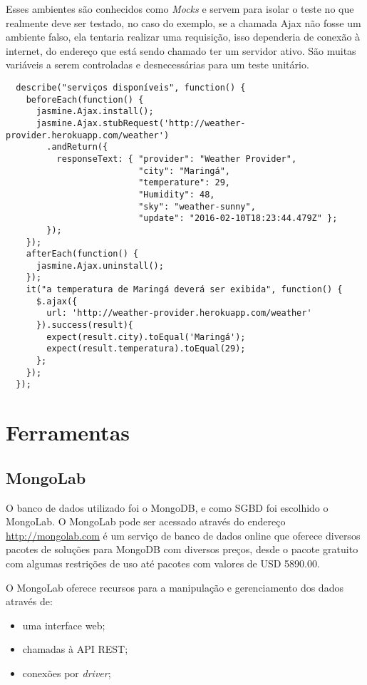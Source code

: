 Esses ambientes são conhecidos como \textit{Mocks} e servem para isolar o teste no que realmente deve ser testado, no caso do exemplo, se a chamada Ajax não fosse um ambiente falso, ela tentaria realizar uma requisição, isso dependeria de conexão à internet, do endereço que está sendo chamado ter um servidor ativo. São muitas variáveis a serem controladas e desnecessárias para um teste unitário.
\begin{verbatim}
  describe("serviços disponíveis", function() {
    beforeEach(function() {
      jasmine.Ajax.install();
      jasmine.Ajax.stubRequest('http://weather-provider.herokuapp.com/weather')
        .andReturn({
          responseText: { "provider": "Weather Provider",
                          "city": "Maringá",
                          "temperature": 29,
                          "Humidity": 48,
                          "sky": "weather-sunny",
                          "update": "2016-02-10T18:23:44.479Z" };
        });
    });
    afterEach(function() {
      jasmine.Ajax.uninstall();
    });
    it("a temperatura de Maringá deverá ser exibida", function() {
      $.ajax({
        url: 'http://weather-provider.herokuapp.com/weather'
      }).success(result){
        expect(result.city).toEqual('Maringá');
        expect(result.temperatura).toEqual(29);
      };
    });
  });
\end{verbatim}

\section{Ferramentas}
\subsection{MongoLab}
O banco de dados utilizado foi o MongoDB, e como SGBD foi escolhido o MongoLab.
O MongoLab pode ser acessado através do endereço \url{http://mongolab.com} é um serviço de banco de dados online que oferece diversos pacotes de soluções para MongoDB com diversos preços, desde o pacote gratuito com algumas restrições de uso até pacotes com valores de USD 5890.00.

O MongoLab oferece recursos para a manipulação e gerenciamento dos dados através de:

\begin{itemize}
  \item uma interface web;
  \item chamadas à API REST;
  \item conexões por \textit{driver};
\end{itemize}


